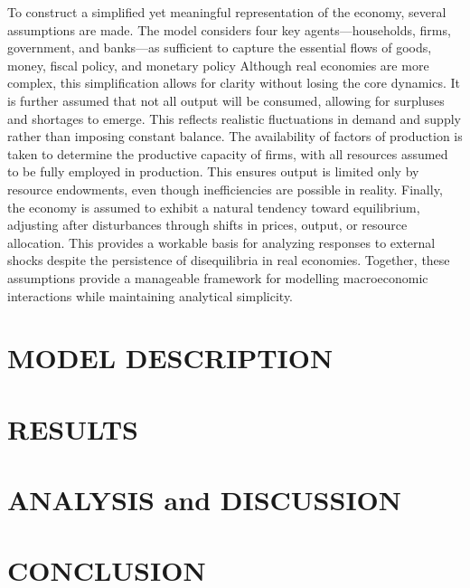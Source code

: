\documentclass[10pt,twocolumn]{witseiepaper}
\begin{document}
To construct a simplified yet meaningful representation of the economy, several assumptions are made.  
The model considers four key agents—households, firms, government, and banks—as sufficient to capture the essential flows of goods, money, fiscal policy, and monetary policy \cite{wolf2013multi} Although real economies are more complex, this simplification allows for clarity without losing the core dynamics.  
It is further assumed that not all output will be consumed, allowing for surpluses and shortages to emerge. This reflects realistic fluctuations in demand and supply rather than imposing constant balance.  
The availability of factors of production is taken to determine the productive capacity of firms, with all resources assumed to be fully employed in production. This ensures output is limited only by resource endowments, even though inefficiencies are possible in reality.  
Finally, the economy is assumed to exhibit a natural tendency toward equilibrium, adjusting after disturbances through shifts in prices, output, or resource allocation. This provides a workable basis for analyzing responses to external shocks despite the persistence of disequilibria in real economies.  
Together, these assumptions provide a manageable framework for modelling macroeconomic interactions while maintaining analytical simplicity.


\section{MODEL DESCRIPTION}

\section{RESULTS}

\section{ANALYSIS and DISCUSSION}

\section{CONCLUSION}


%



\end{document}

